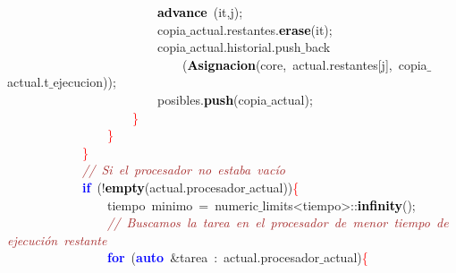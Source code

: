 \mbox{}\ \ \ \ \ \ \ \ \ \ \ \ \ \ \ \ \ \ \ \ \ \ \ \ \textbf{\textcolor{Black}{advance}}\ \textcolor{BrickRed}{(}it\textcolor{BrickRed}{,}j\textcolor{BrickRed}{);} \\
\mbox{}\ \ \ \ \ \ \ \ \ \ \ \ \ \ \ \ \ \ \ \ \ \ \ \ copia$\_$actual\textcolor{BrickRed}{.}restantes\textcolor{BrickRed}{.}\textbf{\textcolor{Black}{erase}}\textcolor{BrickRed}{(}it\textcolor{BrickRed}{);} \\
\mbox{}\ \ \ \ \ \ \ \ \ \ \ \ \ \ \ \ \ \ \ \ \ \ \ \ copia$\_$actual\textcolor{BrickRed}{.}historial\textcolor{BrickRed}{.}push$\_$back \\
\mbox{}\ \ \ \ \ \ \ \ \ \ \ \ \ \ \ \ \ \ \ \ \ \ \ \ \ \ \ \ \textcolor{BrickRed}{(}\textbf{\textcolor{Black}{Asignacion}}\textcolor{BrickRed}{(}core\textcolor{BrickRed}{,}\ actual\textcolor{BrickRed}{.}restantes\textcolor{BrickRed}{[}j\textcolor{BrickRed}{],}\ copia$\_$actual\textcolor{BrickRed}{.}t$\_$ejecucion\textcolor{BrickRed}{));} \\
\mbox{}\ \ \ \ \ \ \ \ \ \ \ \ \ \ \ \ \ \ \ \ \ \ \ \ posibles\textcolor{BrickRed}{.}\textbf{\textcolor{Black}{push}}\textcolor{BrickRed}{(}copia$\_$actual\textcolor{BrickRed}{);} \\
\mbox{}\ \ \ \ \ \ \ \ \ \ \ \ \ \ \ \ \ \ \ \ \textcolor{Red}{\}} \\
\mbox{}\ \ \ \ \ \ \ \ \ \ \ \ \ \ \ \ \textcolor{Red}{\}} \\
\mbox{}\ \ \ \ \ \ \ \ \ \ \ \ \textcolor{Red}{\}} \\
\mbox{}\ \ \ \ \ \ \ \ \ \ \ \ \textit{\textcolor{Brown}{//\ Si\ el\ procesador\ no\ estaba\ vacío}} \\
\mbox{}\ \ \ \ \ \ \ \ \ \ \ \ \textbf{\textcolor{Blue}{if}}\ \textcolor{BrickRed}{(!}\textbf{\textcolor{Black}{empty}}\textcolor{BrickRed}{(}actual\textcolor{BrickRed}{.}procesador$\_$actual\textcolor{BrickRed}{))}\textcolor{Red}{\{} \\
\mbox{}\ \ \ \ \ \ \ \ \ \ \ \ \ \ \ \ \textcolor{TealBlue}{tiempo}\ minimo\ \textcolor{BrickRed}{=}\ numeric$\_$limits\textcolor{BrickRed}{\textless{}}tiempo\textcolor{BrickRed}{\textgreater{}::}\textbf{\textcolor{Black}{infinity}}\textcolor{BrickRed}{();} \\
\mbox{}\ \ \ \ \ \ \ \ \ \ \ \ \ \ \ \ \textit{\textcolor{Brown}{//\ Buscamos\ la\ tarea\ en\ el\ procesador\ de\ menor\ tiempo\ de\ ejecución\ restante}} \\
\mbox{}\ \ \ \ \ \ \ \ \ \ \ \ \ \ \ \ \textbf{\textcolor{Blue}{for}}\ \textcolor{BrickRed}{(}\textbf{\textcolor{Blue}{auto}}\ \textcolor{BrickRed}{\&}tarea\ \textcolor{BrickRed}{:}\ actual\textcolor{BrickRed}{.}procesador$\_$actual\textcolor{BrickRed}{)}\textcolor{Red}{\{} \\
